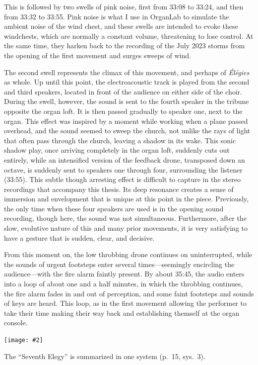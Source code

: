 \documentclass[12pt,twoside,maitrise]{dms_ks}
\newcommand{\customincludeexamples}[4][]{%
    \begin{example}[H]
        \centering
        \texttt{[image: \#2]}
        \caption{#4}
	\label{#3} 
    \end{example}
}
\theoremstyle{definition}
\begin{document}
{This is followed by two swells of pink noise, first from 33:08 to 33:24, and then from 33:32 to 33:55.
Pink noise is what I use in OrganLab to simulate the ambient noise of the wind chest, and these swells are intended to evoke these windchests, which are normally a constant volume, threatening to lose control.
At the same time, they harken back to the recording of the July 2023 storms from the opening of the first movement and surges sweeps of wind.

The second swell represents the climax of this movement, and perhaps of \textit{Élégies} as whole.
Up until this point, the electroacoustic track is played from the second and third speakers, located in front of the audience on either side of the choir.
During the swell, however, the sound is sent to the fourth speaker in the tribune opposite the organ loft.
It is then passed gradually to speaker one, next to the organ.
This effect was inspired by a moment while working when a plane passed overhead, and the sound seemed to sweep the church, not unlike the rays of light that often pass through the church, leaving a shadow in its wake. 
This sonic shadow play, once arriving completely in the organ loft, suddenly cuts out entirely, while an intensified version of the feedback drone, transposed down an octave, is suddenly sent to speakers one through four, surrounding the listener (33:55).
This subtle though arresting effect is difficult to capture in the stereo recordings that accompany this thesis.
Its deep resonance creates a sense of immersion and envelopment that is unique at this point in the piece. 
Previously, the only time when these four speakers are used is in the opening sound recording, though here, the sound was not simultaneous. 
Furthermore, after the slow, evolutive nature of this and many prior movements, it is very satisfying to have a gesture that is sudden, clear, and decisive. 

From this moment on, the low throbbing drone continues on uninterrupted, while the sounds of urgent footsteps enter several times---seemingly encircling the audience---with the fire alarm faintly present. 
By about 35:45, the audio enters into a loop of about one and a half minutes, in which the throbbing continues, the fire alarm fades in and out of perception, and some faint footsteps and sounds of keys are heard.  
This loop, as in the first movement allowing the performer to take their time making their way back and establishing themself at the organ console.

\customincludeexamples[width=\textwidth]{7e_1}{ex:7e_1}{The “Seventh Elegy” is summarized in one system (p.~15, sys.~3).}

}
\end{document}
